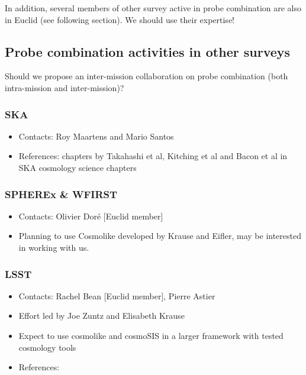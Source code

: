In addition, several members of other survey active in probe combination are also in Euclid (see following section).
We should use their expertise!

\subsection{Probe combination activities in other surveys}

Should we propose an inter-mission collaboration on probe combination (both intra-mission and inter-mission)?

\subsubsection{SKA}

\begin{itemize}
\item Contacts: Roy Maartens and Mario Santos
\item References: chapters by Takahashi et al, Kitching et al and Bacon et al in SKA cosmology science chapters
\end{itemize}

\subsubsection{SPHEREx \& WFIRST}

\begin{itemize}
\item Contacts: Olivier Dor\'e  [Euclid member]
\item Planning to use Cosmolike developed by Krause and Eifler, may be interested in working with us.
\end{itemize}



\subsubsection{LSST}

\begin{itemize}
\item Contacts: Rachel Bean [Euclid member], Pierre Astier
\item Effort led by Joe Zuntz and Elisabeth Krause
\item Expect to use cosmolike and cosmoSIS in a larger framework with tested cosmology tools
\item References: 
\end{itemize}



